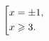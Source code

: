 \documentclass[preview]{standalone}
\begin{document}
\begin{align*}
\left[ \begin{gathered} x = \pm 1, \\ x \geqslant 3. \hfill \end{gathered} \right.
\end{align*}
\end{document}

